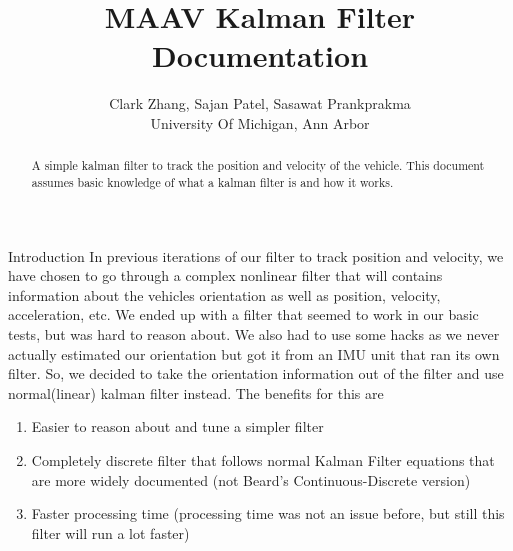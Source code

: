\documentclass[12pt]{article}
\begin{document}
\title{MAAV Kalman Filter Documentation}

\author{Clark Zhang, Sajan Patel, Sasawat Prankprakma\\
University Of Michigan, Ann Arbor}

\maketitle
\begin{abstract}
A simple kalman filter to track the position and velocity of the vehicle. This document assumes basic knowledge of what a kalman filter is and how it works.
\end{abstract}

\begin{section}{Introduction}
In previous iterations of our filter to track position and velocity, we have chosen to go through a complex nonlinear filter that will contains information about the vehicles orientation as well as position, velocity, acceleration, etc. We ended up with a filter that seemed to work in our basic tests, but was hard to reason about. We also had to use some hacks as we never actually estimated our orientation but got it from an IMU unit that ran its own filter.
So, we decided to take the orientation information out of the filter and use normal(linear) kalman filter instead. The benefits for this are
\begin{enumerate}
\item Easier to reason about and tune a simpler filter
\item Completely discrete filter that follows normal Kalman Filter equations that are more widely documented (not Beard's Continuous-Discrete version)
\item Faster processing time (processing time was not an issue before, but still this filter will run a lot faster)
\end{enumerate}

\end{section}
\end{document}
